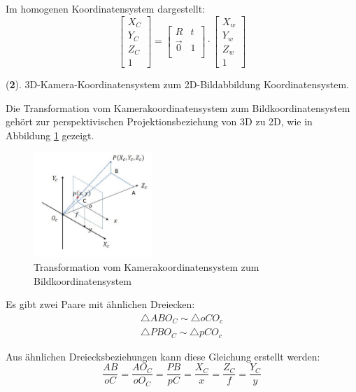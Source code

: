 Im homogenen Koordinatensystem dargestellt:
\begin{equation}
   \begin{bmatrix}
	X_C \\  
	Y_C \\
	Z_C \\
	1
	\end{bmatrix} = \begin{bmatrix}
	R & t	\\
	\vec{0}	& 1 \\
	\end{bmatrix} \cdot \begin{bmatrix}
	X_w \\  
	Y_w \\
	Z_w \\
	1
	\end{bmatrix}
\end{equation}

(\textbf{2}). 3D-Kamera-Koordinatensystem zum 2D-Bildabbildung Koordinatensystem.

Die Transformation vom Kamerakoordinatensystem zum Bildkoordinatensystem gehört zur perspektivischen Projektionsbeziehung von 3D zu 2D, wie in Abbildung \ref{fig:Czuimage} gezeigt.

\begin{figure}[H]
 \centering 
 \includegraphics[keepaspectratio,width=0.4\textwidth]{images/3_Ersteverfahren/Kamera/Czuimage.pdf}
 \caption{Transformation vom Kamerakoordinatensystem zum Bildkoordinatensystem}
 \label{fig:Czuimage}
\end{figure} 

Es gibt zwei Paare mit ähnlichen Dreiecken:
\begin{equation}
   \begin{split}
    \triangle ABO_C \sim \triangle oCO_c\\  
	\triangle PBO_C \sim \triangle pCO_c
	\end{split}
\end{equation}

Aus ähnlichen Dreiecksbeziehungen kann diese Gleichung erstellt werden:
\begin{equation}
   \frac{AB}{oC} = \frac{AO_C}{oO_C} = \frac{PB}{pC} = \frac{X_C}{x} = \frac{Z_C}{f} = \frac{Y_C}{y} 
\end{equation}

